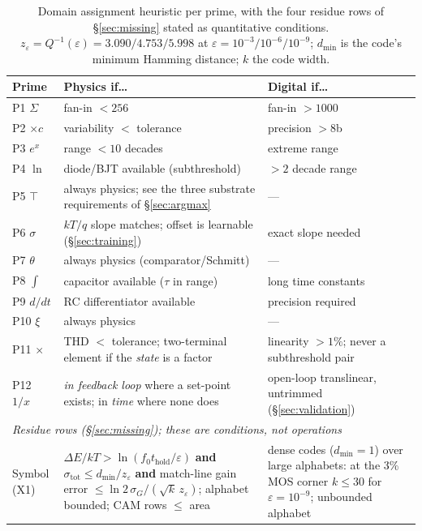 \documentclass[11pt]{article}
\begin{document}
\begin{table}[h]
\centering
\caption{Domain assignment heuristic per prime, with the four residue rows of \S\ref{sec:missing} stated as quantitative conditions. $z_\varepsilon = Q^{-1}(\varepsilon) = 3.090 / 4.753 / 5.998$ at $\varepsilon = 10^{-3}/10^{-6}/10^{-9}$; $d_{\min}$ is the code's minimum Hamming distance; $k$ the code width.}
\label{tab:assignment}
\footnotesize
\begin{tabular}{p{1.9cm}p{6.6cm}p{5.6cm}}
\toprule
Prime & Physics if\ldots & Digital if\ldots \\
\midrule
P1 $\Sigma$ & fan-in $< 256$ & fan-in $> 1000$ \\
P2 $\times c$ & variability $<$ tolerance & precision $> 8$b \\
P3 $e^x$ & range $< 10$ decades & extreme range \\
P4 $\ln$ & diode/BJT available (subthreshold) & $> 2$ decade range \\
P5 $\top$ & always physics; see the three substrate requirements of \S\ref{sec:argmax} & --- \\
P6 $\sigma$ & $kT/q$ slope matches; offset is learnable (\S\ref{sec:training}) & exact slope needed \\
P7 $\theta$ & always physics (comparator/Schmitt) & --- \\
P8 $\int$ & capacitor available ($\tau$ in range) & long time constants \\
P9 $d/dt$ & RC differentiator available & precision required \\
P10 $\xi$ & always physics & --- \\
P11 $\times$ & THD $<$ tolerance; two-terminal element if the \textit{state} is a factor & linearity $> 1\%$; never a subthreshold pair \\
P12 $1/x$ & \textit{in feedback loop} where a set-point exists; in \textit{time} where none does & open-loop translinear, untrimmed (\S\ref{sec:validation}) \\
\midrule
\multicolumn{3}{l}{\textit{Residue rows (\S\ref{sec:missing}); these are conditions, not operations}} \\
Symbol (X1) & $\Delta E/kT > \ln(f_0 t_{\mathrm{hold}}/\varepsilon)$ \textbf{and} $\sigma_{\mathrm{tot}} \le d_{\min}/z_\varepsilon$ \textbf{and} match-line gain error $\le \ln 2\,\sigma_G/(\sqrt{k}\,z_\varepsilon)$; alphabet bounded; CAM rows $\le$ area & dense codes ($d_{\min}=1$) over large alphabets: at the 3\% MOS corner $k \le 30$ for $\varepsilon = 10^{-9}$; unbounded alphabet \\

\end{tabular}
\end{table}
\end{document}
